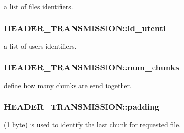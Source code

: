 a list of files identifiers. 

\hypertarget{structHEADER__TRANSMISSION_ae1d8e1fcc8178250b212f77325022424}{
\subsubsection[{id\-\_\-utenti}]{\setlength{\rightskip}{0pt plus 5cm}H\-E\-A\-D\-E\-R\-\_\-\-T\-R\-A\-N\-S\-M\-I\-S\-S\-I\-O\-N\-::id\-\_\-utenti}}\label{structHEADER__TRANSMISSION_ae1d8e1fcc8178250b212f77325022424}


a list of users identifiers. 

\hypertarget{structHEADER__TRANSMISSION_abee64c077b815db300d99d1e2a273af7}{
\subsubsection[{num\-\_\-chunks}]{\setlength{\rightskip}{0pt plus 5cm}H\-E\-A\-D\-E\-R\-\_\-\-T\-R\-A\-N\-S\-M\-I\-S\-S\-I\-O\-N\-::num\-\_\-chunks}}\label{structHEADER__TRANSMISSION_abee64c077b815db300d99d1e2a273af7}


define how many chunks are send together. 

\hypertarget{structHEADER__TRANSMISSION_a74de1a2343e132bf28eb6e83b4601d34}{
\subsubsection[{padding}]{\setlength{\rightskip}{0pt plus 5cm}H\-E\-A\-D\-E\-R\-\_\-\-T\-R\-A\-N\-S\-M\-I\-S\-S\-I\-O\-N\-::padding}}\label{structHEADER__TRANSMISSION_a74de1a2343e132bf28eb6e83b4601d34}


(1 byte) is used to identify the last chunk for requested file. 

